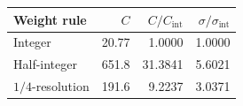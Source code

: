 \begin{tabular}{lrrr}
\toprule
Weight rule & $C$ & $C / C_{\text{int}}$ & $\sigma / \sigma_{\text{int}}$ \\
\midrule
Integer & 20.77 & 1.0000 & 1.0000 \\
Half-integer & 651.8 & 31.3841 & 5.6021 \\
$1/4$-resolution & 191.6 & 9.2237 & 3.0371 \\
\bottomrule
\end{tabular}
